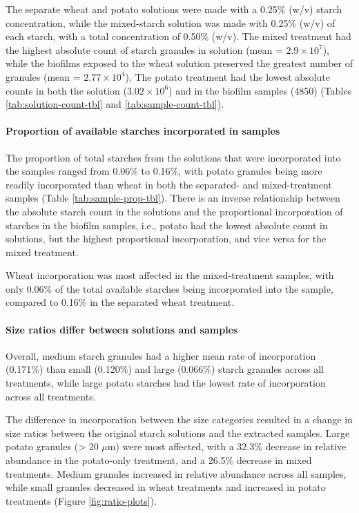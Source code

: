 \documentclass[utf8]{../templates/frontiersSCNS}
\begin{document}
The separate wheat and potato solutions were made with a 0.25\% (w/v) starch
concentration, while the mixed-starch solution was made with 0.25\% (w/v) of each
starch, with a total concentration of 0.50\% (w/v).
The mixed treatment had the highest absolute count of starch granules in solution (mean = \ensuremath{2.9\times 10^{7}}),
while the biofilms exposed to the wheat solution preserved the greatest number of
granules
(mean = \ensuremath{2.77\times 10^{4}}).
The potato treatment had the lowest absolute counts in both the solution
(\ensuremath{3.02\times 10^{6}})
and in the biofilm samples
(4850)
(Tables \ref{tab:solution-count-tbl} and \ref{tab:sample-count-tbl}).

\paragraph{Proportion of available starches incorporated in samples}\label{proportion-of-available-starches-incorporated-in-samples}

The proportion of total starches from the solutions that were incorporated
into the samples ranged from
0.06\% to 0.16\%,
with potato granules being more readily incorporated than wheat in both the
separated- and mixed-treatment samples
(Table \ref{tab:sample-prop-tbl}).
There is an inverse relationship between the absolute starch count in the solutions
and the proportional incorporation of starches in the biofilm samples, i.e., potato
had the lowest absolute count in solutions, but the highest proportional
incorporation, and vice versa for the mixed treatment.

Wheat incorporation was most affected in the mixed-treatment samples, with only
0.06\% of the total available starches being incorporated into
the sample, compared to
0.16\%
in the separated wheat treatment.

\paragraph{Size ratios differ between solutions and samples}\label{size-ratios-differ-between-solutions-and-samples}

Overall, medium starch granules had a higher mean rate of incorporation
(0.171\%)
than small
(0.120\%)
and large
(0.066\%)
starch granules across all treatments, while large potato starches had the lowest
rate of incorporation across all treatments.

The difference in incorporation between the size categories resulted in a change
in size ratios between the original starch solutions and the extracted samples.
Large potato granules (\textgreater{} 20 \(\mu\)m) were most affected, with a
32.3\%
decrease in relative abundance in the potato-only treatment, and a
26.5\%
decrease in mixed treatments. Medium granules increased in relative abundance
across all samples, while small granules decreased in wheat treatments and
increased in potato treatments
(Figure \ref{fig:ratio-plots}).
\end{document}
